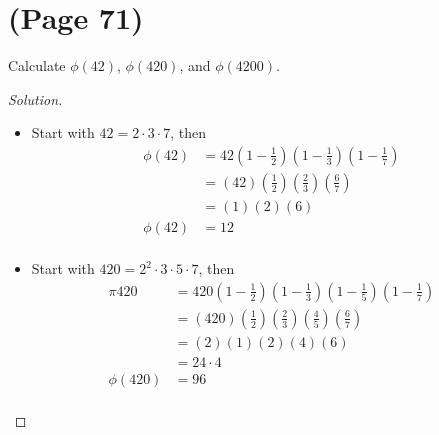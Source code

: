 \documentclass[11pt]{article}
\newenvironment{problem}[2][Problem]{\begin{trivlist}
\item[\hskip \labelsep {\bfseries #1}\hskip \labelsep {\bfseries #2.}]}{\end{trivlist}}
\newenvironment{solution}
  {\renewcommand\qedsymbol{$~$}\begin{proof}[Solution]$ $\par\nobreak\ignorespaces}
  {\end{proof}}
\begin{document}
\section{(Page 71)}

\begin{problem}{1}
Calculate $\phi(42)$, $\phi(420)$, and $\phi(4200)$.
\end{problem}

\begin{solution}
    \begin{itemize}
        \item [\textbf{42}]
              Start with $42=2\cdot 3\cdot 7$, then
              \begin{align*}
                  \phi(42) & = 42 \left(1-\frac{1}{2}\right)\left(1-\frac{1}{3}\right)\left(1-\frac{1}{7}\right) \\
                           & = (42)\left(\frac{1}{2}\right)\left(\frac{2}{3}\right)\left(\frac{6}{7}\right)      \\
                           & = (1)(2)(6)                                                                         \\
                  \phi(42) & = 12                                                                                \\
              \end{align*}

        \item [\textbf{420}]
              Start with $420= 2^2 \cdot 3 \cdot 5 \cdot 7$, then
              \begin{align*}
                  \pi{420}  & = 420 \left(1-\frac{1}{2}\right)\left(1-\frac{1}{3}\right)\left(1-\frac{1}{5}\right)\left(1-\frac{1}{7}\right) \\
                            & = (420)\left(\frac{1}{2}\right)\left(\frac{2}{3}\right)\left(\frac{4}{5}\right)\left(\frac{6}{7}\right)        \\
                            & = (2) (1) (2) (4) (6)                                                                                          \\
                            & = 24 \cdot 4                                                                                                   \\
                  \phi(420) & = 96                                                                                                           \\
              \end{align*}


\end{itemize}
\end{solution}
\end{document}
